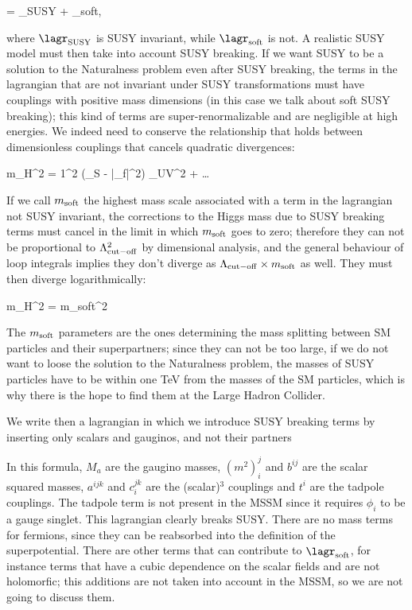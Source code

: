 \beq
\lagr = \lagr_{\rm SUSY} + \lagr_{\rm soft},
\eeq

where $\lagr_{\rm SUSY}$ is SUSY invariant, while $\lagr_{\rm soft}$ is not. A realistic SUSY model must then take into account SUSY breaking. If we want SUSY to be a solution to the Naturalness problem even after SUSY breaking, the terms in the lagrangian that are not invariant under SUSY transformations must have couplings with positive mass dimensions (in this case we talk about soft SUSY breaking); this kind of terms are super-renormalizable and are negligible at high energies. We indeed need to conserve the relationship that holds between dimensionless couplings that cancels quadratic divergences:

\beq
\Delta m_H^2 = {1\pi^2} (\lambda_S - |\lambda_f|^2)
\Lambda_{\rm UV}^2 + \ldots 
\label{eq:royalewithcheese}
\eeq

If we call $m_{\rm soft}$ the highest mass scale associated with a term in the lagrangian not SUSY invariant, the corrections to the Higgs mass due to SUSY breaking terms must cancel in the limit in which $m_{\rm soft}$ goes to zero; therefore they can not be proportional to  $\Lambda_{\rm cut-off}^2$ by dimensional analysis, and the general behaviour of loop integrals implies they don't diverge as $\Lambda_{\rm cut-off}\times m_{\rm soft}$ as well. They must then diverge logarithmically:

\beq
\Delta m_{H}^2 =
m_{\rm soft}^2
\label{eq:softy}
\eeq

The $m_{\rm soft}$ parameters are the ones determining the mass splitting between SM particles and their superpartners; since they can not be too large, if we do not want to loose the solution to the Naturalness problem, the masses of SUSY particles have to be within one TeV from the masses of the SM particles, which is why there is the hope to find them at the Large Hadron Collider. 

We write then a lagrangian in which we introduce SUSY breaking terms by inserting only scalars and gauginos, and not their partners


In this formula, $M_a$ are the gaugino masses, $(m^2)_i^j$ and $b^{ij}$ are the scalar squared masses, $a^{ijk}$ and $c_i^{jk}$ are the (scalar)$^3$ couplings and $t^i$ are the tadpole couplings. The tadpole term is not present in the MSSM since it requires $\phi_i$ to be a gauge singlet. This lagrangian clearly breaks SUSY. There are no mass terms for fermions, since they can be reabsorbed into the definition of the superpotential. There are other terms that can contribute to $\lagr_{\rm soft}$, for instance terms that have a cubic dependence on the scalar fields and are not holomorfic; this additions are not taken into account in the MSSM, so we are not going to discuss them.

